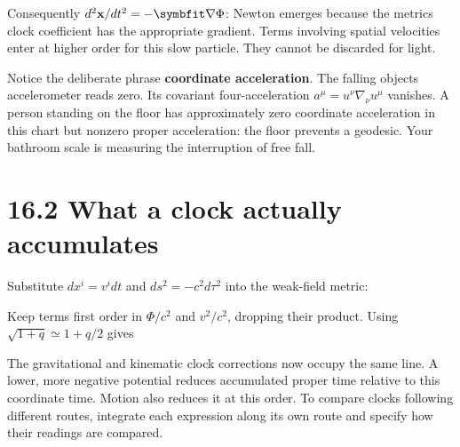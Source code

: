 \documentclass[
  11pt,
  letterpaper,
  oneside,
  openany]{scrbook}
\begin{document}
Consequently \(d^2\mathbf x/dt^2=-\symbfit\nabla\Phi\): Newton emerges
because the metric\textquotesingle s clock coefficient has the
appropriate gradient. Terms involving spatial velocities enter at higher
order for this slow particle. They cannot be discarded for light.

Notice the deliberate phrase \textbf{coordinate acceleration}. The
falling object\textquotesingle s accelerometer reads zero. Its covariant
four-acceleration \(a^\mu=u^\nu\nabla_\nu u^\mu\) vanishes. A person
standing on the floor has approximately zero coordinate acceleration in
this chart but nonzero proper acceleration: the floor prevents a
geodesic. Your bathroom scale is measuring the interruption of free
fall.

\hypertarget{what-a-clock-actually-accumulates}{%
\section{16.2 What a clock actually
accumulates}\label{what-a-clock-actually-accumulates}}

Substitute \(dx^i=v^i dt\) and \(ds^2=-c^2d\tau^2\) into the weak-field
metric:

\begin{center}
\begingroup
{}
\ifdim\wd\grmathbox>\linewidth
\resizebox{\linewidth}{!}{\usebox{\grmathbox}}
\else\usebox{\grmathbox}\fi
\endgroup
\end{center}

Keep terms first order in \(\Phi/c^2\) and \(v^2/c^2\), dropping their
product. Using \(\sqrt{1+q}\simeq1+q/2\) gives

\begin{center}
\begingroup
{}
\ifdim\wd\grmathbox>\linewidth
\resizebox{\linewidth}{!}{\usebox{\grmathbox}}
\else\usebox{\grmathbox}\fi
\endgroup
\end{center}

The gravitational and kinematic clock corrections now occupy the same
line. A lower, more negative potential reduces accumulated proper time
relative to this coordinate time. Motion also reduces it at this order.
To compare clocks following different routes, integrate each expression
along its own route and specify how their readings are compared.
\end{document}
